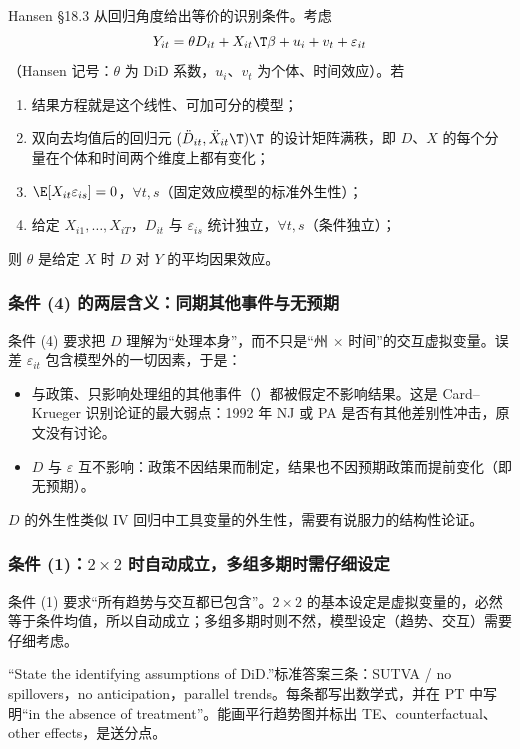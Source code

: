 Hansen §18.3 从回归角度给出等价的识别条件。考虑
\[
Y_{it}=\theta D_{it}+X_{it}\T\beta+u_i+v_t+\varepsilon_{it}
\]
（Hansen 记号：$\theta$ 为 DiD 系数，$u_i$、$v_t$ 为个体、时间效应）。若
\begin{enumerate}
  \item 结果方程就是这个线性、可加可分的模型；
  \item 双向去均值后的回归元 $(\ddot D_{it},\ddot X_{it}\T)\T$ 的设计矩阵满秩，即 $D$、$X$ 的每个分量在个体和时间两个维度上都有变化；
  \item $\E[X_{it}\varepsilon_{is}]=0$，$\forall t,s$（固定效应模型的标准外生性）；
  \item 给定 $X_{i1},\dots,X_{iT}$，$D_{it}$ 与 $\varepsilon_{is}$ 统计独立，$\forall t,s$（条件独立）；
\end{enumerate}
则 $\theta$ 是给定 $X$ 时 $D$ 对 $Y$ 的平均因果效应。

\subsubsection{条件 (4) 的两层含义：同期其他事件与无预期}

条件 (4) 要求把 $D$ 理解为“处理本身”，而不只是“州 $\times$ 时间”的交互虚拟变量。误差 $\varepsilon_{it}$ 包含模型外的一切因素，于是：
\begin{itemize}
  \item 与政策、只影响处理组的其他事件（）都被假定不影响结果。这是 Card--Krueger 识别论证的最大弱点：1992 年 NJ 或 PA 是否有其他差别性冲击，原文没有讨论。
  \item $D$ 与 $\varepsilon$ 互不影响：政策不因结果而制定，结果也不因预期政策而提前变化（即无预期）。
\end{itemize}
$D$ 的外生性类似 IV 回归中工具变量的外生性，需要有说服力的结构性论证。

\subsubsection{条件 (1)：\texorpdfstring{$2\times2$}{2x2} 时自动成立，多组多期时需仔细设定}

条件 (1) 要求“所有趋势与交互都已包含”。$2\times2$ 的基本设定是虚拟变量的，必然等于条件均值，所以自动成立；多组多期时则不然，模型设定（趋势、交互）需要仔细考虑。

\begin{keypt}[英文试卷常见问法]
“State the identifying assumptions of DiD.”标准答案三条：SUTVA / no spillovers，no anticipation，parallel trends。每条都写出数学式，并在 PT 中写明“in the absence of treatment”。能画平行趋势图并标出 TE、counterfactual、other effects，是送分点。
\end{keypt}

